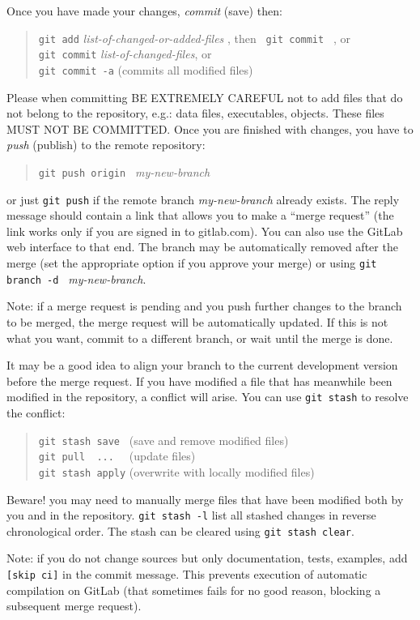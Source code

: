 \documentclass[12pt,a4paper]{article}
\begin{document}
Once you have made your changes, {\em commit} (save) then:
\begin{quote}
  \verb|git add| {\em list-of-changed-or-added-files} , then
	\verb| git commit | , or \\
  \verb|git commit| {\em list-of-changed-files}, or \\
  \verb|git commit -a| (commits all modified files)
\end{quote}
Please when committing BE EXTREMELY CAREFUL not to add files that do 
not belong to the repository, e.g.: data files, executables, objects.
These files MUST NOT BE COMMITTED.
Once you are finished with changes, you have to {\em push} (publish)
to the remote repository:
\begin{quote}
  \verb|git push origin | {\em my-new-branch}
\end{quote}
or just \verb|git push| if the remote branch  {\em my-new-branch} already
exists. The reply message should contain a link that allows you to make
a ``merge request'' (the link works only if you are signed in to gitlab.com).
You can also use the GitLab web interface to that end.
The branch may be automatically removed after the merge (set the appropriate
option if you approve your merge) or using \verb|git branch -d | 
{\em my-new-branch}.

Note: if a merge request is pending and you push further changes to the
branch to be merged, the merge request will be automatically updated.
If this is not what you want, commit to a different branch, or wait
until the merge is done.

It may be a good idea to align your branch to the current development
version before the merge request. If you have modified a file that has
meanwhile been modified in the repository, a conflict will arise. You
can use \texttt{git stash} to resolve the conflict:
\begin{quote}
  \verb|git stash save | (save and remove modified files)\\
  \verb|git pull  ...  | (update files)\\
  \verb|git stash apply| (overwrite with locally modified files)
\end{quote}
Beware! you may need to manually merge files that have been modified both 
by you and in the repository. \texttt{git stash -l} list all stashed
changes in reverse chronological order. The stash can be cleared using
\texttt{git stash clear}.

Note: if you do not change sources but only documentation, tests, examples,
add \verb|[skip ci]| in the commit message. This prevents execution of 
automatic compilation on GitLab (that sometimes fails for no good reason,
blocking a subsequent merge request).
\end{document}
